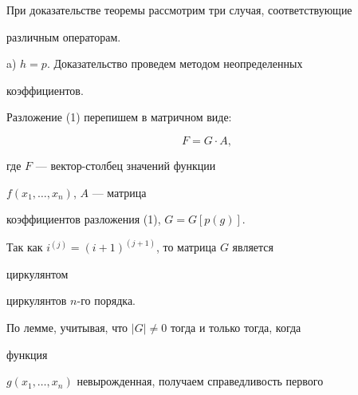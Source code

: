 




При доказательстве теоремы рассмотрим три случая, соответствующие


различным операторам.





a) $h=p$. Доказательство проведем методом неопределенных


коэффициентов.





Разложение (1) перепишем в матричном виде:


$$


F=G\cdot A,


$$


где $F$ --- вектор-столбец значений функции


$f(x_1,\dotsc,x_n)$, $A$ --- матрица


коэффициентов разложения (1), $G=G[p(g)]$.





Так как $i^{(j)}=(i+1)^{(j+1)}$, то матрица $G$ является


циркулянтом


циркулянтов $n$-го порядка.





По лемме, учитывая, что $|G|\ne 0$ тогда и только тогда, когда


функция


$g(x_1,\dotsc,x_n)$ невырожденная, получаем справедливость первого


